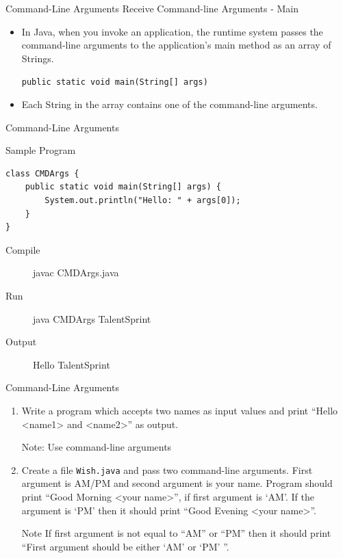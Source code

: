 \documentclass[12pt]{beamer}
\begin{document}
\begin{frame}{Command-Line Arguments}
 Receive Command-line Arguments - Main
 \begin{itemize}
  \item In Java, when you invoke an application, the runtime system passes the command-line arguments to the application's main method as an array of Strings.
 
 \lstinline!public static void main(String[] args)!
 
 \item Each String in the array contains one of the command-line arguments.
 \end{itemize}
\end{frame}

\begin{frame}[fragile]{Command-Line Arguments}
 \begin{block}{Sample Program} 
  \begin{lstlisting}[numbers=none]
class CMDArgs {
    public static void main(String[] args) {
        System.out.println("Hello: " + args[0]);
    }
}
 \end{lstlisting}
 \end{block}
\begin{description}
 \item [Compile] javac  CMDArgs.java
 \item [Run] java  CMDArgs TalentSprint
 \item [Output] Hello TalentSprint
\end{description}
\end{frame}

\begin{frame}{Command-Line Arguments}
\begin{enumerate}
 \item Write a program which accepts two names as input values and  print ``Hello <name1> and <name2>'' as output.
 
 Note: Use command-line arguments

 \item Create a file \lstinline!Wish.java! and pass two command-line arguments. First argument is AM/PM and second argument is your name. Program should  print ``Good Morning <your name>'', if first argument is `AM'.  If the argument is `PM' then it should print ``Good Evening <your name>''.
 \begin{block}{Note}
 If first argument is not equal to ``AM'' or ``PM'' then it should print ``First argument should be either `AM' or `PM' ''. 
 \end{block}
 \end{enumerate}
\end{frame}
\end{document}

